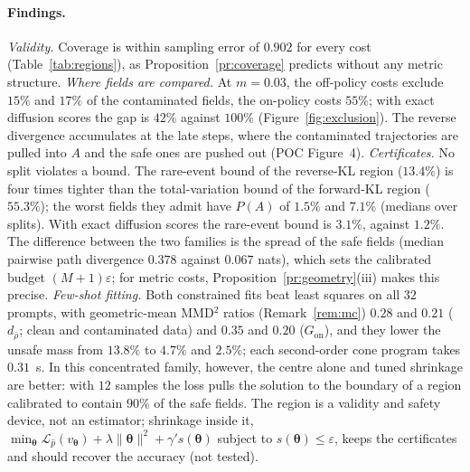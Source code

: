\documentclass{article}
\newcommand{\cL}{\mathcal{L}}
\newcommand{\bth}{\boldsymbol{\theta}}
\theoremstyle{plain}
\theoremstyle{remark}
\begin{document}
\paragraph{Findings.}
\emph{Validity.} Coverage is within sampling error of $0.902$ for every cost
(Table~\ref{tab:regions}), as Proposition~\ref{pr:coverage} predicts without any metric
structure.
\emph{Where fields are compared.} At $m=0.03$, the off-policy costs exclude $15\%$ and $17\%$ of the
contaminated fields, the on-policy costs $55\%$; with exact diffusion scores the gap is $42\%$
against $100\%$ (Figure~\ref{fig:exclusion}). The reverse divergence accumulates at the late steps,
where the contaminated trajectories are pulled into $A$ and the safe ones are pushed out (POC
Figure~4).
\emph{Certificates.} No split violates a bound. The rare-event bound of the reverse-KL region
($13.4\%$) is four times tighter than the total-variation bound of the forward-KL region
($55.3\%$); the worst fields they admit have $P(A)$ of $1.5\%$ and $7.1\%$ (medians over splits).
With exact diffusion scores the rare-event bound is $3.1\%$, against $1.2\%$. The difference between
the two families is the spread of the safe fields (median pairwise path divergence $0.378$ against
$0.067$ nats), which sets the calibrated budget $(M+1)\varepsilon$; for metric costs,
Proposition~\ref{pr:geometry}(iii) makes this precise.
\emph{Few-shot fitting.} Both constrained fits beat least squares on all $32$ prompts, with
geometric-mean MMD$^2$ ratios (Remark~\ref{rem:mc}) $0.28$ and $0.21$ ($d_{\bar\rho}$; clean and contaminated data) and $0.35$
and $0.20$ ($G_{\mathrm{on}}$), and they lower the unsafe mass from $13.8\%$ to $4.7\%$ and $2.5\%$; each
second-order cone program takes $0.31$~s. In this concentrated family, however, the centre alone and tuned shrinkage are better:
with $12$ samples the loss pulls the solution to the boundary of a region calibrated to contain
$90\%$ of the safe fields. The region is a validity and safety device, not an estimator;
shrinkage inside it, $\min_{\bth}\cL_{\hat p}(v_{\bth})+\lambda\|\bth\|^2+\gamma' s(\bth)$ subject to $s(\bth)\le\varepsilon$, keeps
the certificates and should recover the accuracy (not tested).
\end{document}
